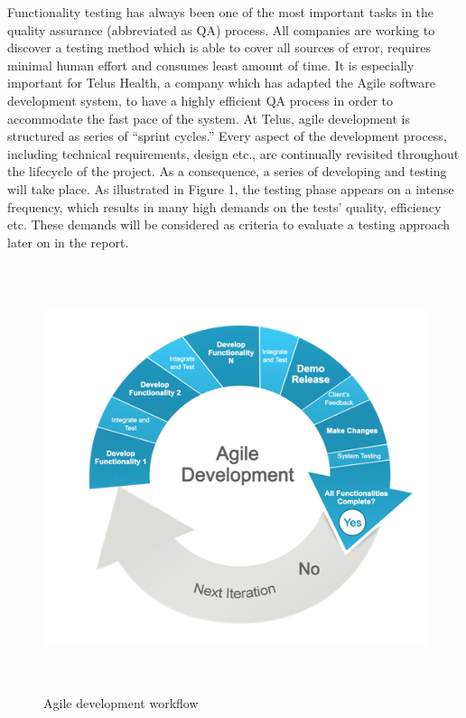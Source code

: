 \documentclass[12pt]{article}
\begin{document}
Functionality testing has always been one of the most important tasks in the quality assurance (abbreviated as QA) process. All companies are working to discover a testing method which is able to cover all sources of error, requires minimal human effort and consumes least amount of time. It is especially important for Telus Health, a company which has adapted the Agile software development system, to have a highly efficient QA process in order to accommodate the fast pace of the system. At Telus, agile development is structured as series of “sprint cycles.” Every aspect of the development process, including technical requirements, design etc., are continually revisited throughout the lifecycle of the project. As a consequence, a series of developing and testing will take place. As illustrated in Figure 1, the testing phase appears on a intense frequency, which results in many high demands on the tests' quality, efficiency etc. These demands will be considered as criteria to evaluate a testing approach later on in the report.\\

\begin{figure}[ht!]
\centering
\includegraphics[width=12.5cm,height=12.5cm,keepaspectratio]{img/agile.png}
\caption{Agile development workflow}
\label{overflow}
\end{figure}
\end{document}
